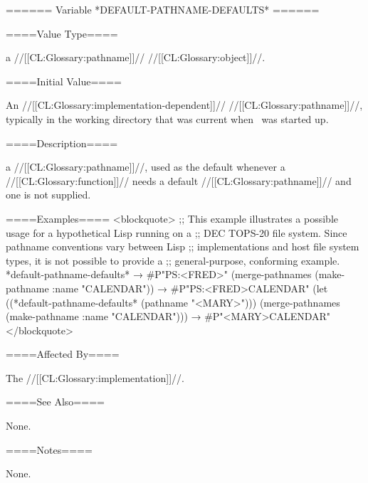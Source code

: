 ====== Variable *DEFAULT-PATHNAME-DEFAULTS* ======

====Value Type====

a //[[CL:Glossary:pathname]]// //[[CL:Glossary:object]]//.

====Initial Value====

An //[[CL:Glossary:implementation-dependent]]// //[[CL:Glossary:pathname]]//, typically in the working directory that was current when \clisp\ was started up.

====Description====

a //[[CL:Glossary:pathname]]//, used as the default whenever a //[[CL:Glossary:function]]// needs a default //[[CL:Glossary:pathname]]// and one is not supplied.

====Examples==== <blockquote> ;; This example illustrates a possible usage for a hypothetical Lisp running on a ;; DEC TOPS-20 file system. Since pathname conventions vary between Lisp ;; implementations and host file system types, it is not possible to provide a ;; general-purpose, conforming example. *default-pathname-defaults* → #P"PS:<FRED>" (merge-pathnames (make-pathname :name "CALENDAR")) → #P"PS:<FRED>CALENDAR" (let ((*default-pathname-defaults* (pathname "<MARY>"))) (merge-pathnames (make-pathname :name "CALENDAR"))) → #P"<MARY>CALENDAR" </blockquote>

====Affected By====

The //[[CL:Glossary:implementation]]//.

====See Also====

None.

====Notes====

None.

